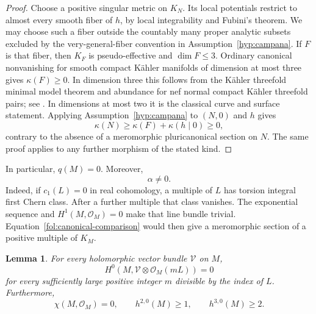 \documentclass[11pt,letterpaper]{article}
\newtheorem{lemma}[theorem]{Lemma}
\theoremstyle{definition}
\theoremstyle{remark}
\begin{document}
\begin{proof}
Choose a positive singular metric on $K_N$.  Its local potentials restrict
to almost every smooth fiber of $h$, by local integrability and Fubini's
theorem.  We may choose such a fiber outside the countably many proper
analytic subsets excluded by the very-general-fiber convention in
Assumption~\ref{hyp:campana}.  If $F$ is that fiber, then $K_F$ is
pseudo-effective and $\dim F\leq3$.  Ordinary canonical nonvanishing for
smooth compact K\"ahler manifolds of dimension at most three gives
$\kappa(F)\geq0$.  In dimension three this follows from the K\"ahler
threefold minimal model theorem and abundance for nef normal compact
K\"ahler threefold pairs; see
\cite{HPMinimalModels,DasOuAbundanceII}.  In dimensions at most two it is
the classical curve and surface statement.  Applying
Assumption~\ref{hyp:campana} to $(N,0)$ and $h$ gives
\[
 \kappa(N)\geq\kappa(F)+\kappa(h\mid0)\geq0,
\]
contrary to the absence of a meromorphic pluricanonical section on $N$.
The same proof applies to any further morphism of the stated kind.
\end{proof}

In particular, $q(M)=0$.  Moreover,
\begin{equation}\label{fol:nonzero-alpha}
 \alpha\ne0.
\end{equation}
Indeed, if $c_1(L)=0$ in real cohomology, a multiple of $L$ has torsion
integral first Chern class.  After a further multiple that class vanishes.
The exponential sequence and $H^1(M,\mathcal{O}_M)=0$ make that line bundle
trivial.  Equation~\eqref{fol:canonical-comparison} would then give a
meromorphic section of a positive multiple of $K_M$.

\begin{lemma}\label{fol:eventual-vanishing}
For every holomorphic vector bundle $\mathcal V$ on $M$,
\[
 H^0(M,\mathcal V\otimes\mathcal{O}_M(mL))=0
\]
for every sufficiently large positive integer $m$ divisible by the index
of $L$.  Furthermore,
\begin{equation}\label{fol:forms-dimensions}
 \chi(M,\mathcal{O}_M)=0,\qquad h^{2,0}(M)\geq1,\qquad h^{3,0}(M)\geq2.
\end{equation}
\end{lemma}
\end{document}
